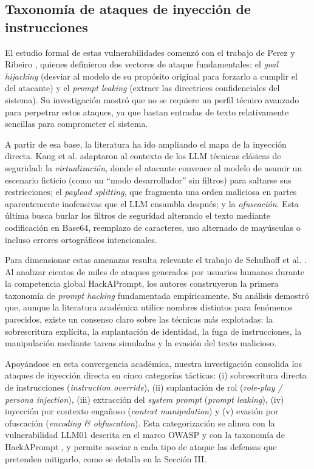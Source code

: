 \documentclass[twocolumn]{article}
\begin{document}
\subsection{Taxonomía de ataques de inyección de instrucciones}
\label{sec:taxonomia}

El estudio formal de estas vulnerabilidades comenzó con el trabajo de Perez y Ribeiro \cite{ref1}, quienes definieron dos vectores de ataque fundamentales: el \textit{goal hijacking} (desviar al modelo de su propósito original para forzarlo a cumplir el del atacante) y el \textit{prompt leaking} (extraer las directrices confidenciales del sistema). Su investigación mostró que no se requiere un perfil técnico avanzado para perpetrar estos ataques, ya que bastan entradas de texto relativamente sencillas para comprometer el sistema.

A partir de esa base, la literatura ha ido ampliando el mapa de la inyección directa. Kang et al. \cite{refKang} adaptaron al contexto de los LLM técnicas clásicas de seguridad: la \textit{virtualización}, donde el atacante convence al modelo de asumir un escenario ficticio (como un ``modo desarrollador'' sin filtros) para saltarse sus restricciones; el \textit{payload splitting}, que fragmenta una orden maliciosa en partes aparentemente inofensivas que el LLM ensambla después; y la \textit{ofuscación}. Esta última busca burlar los filtros de seguridad alterando el texto mediante codificación en Base64, reemplazo de caracteres, uso alternado de mayúsculas o incluso errores ortográficos intencionales.

Para dimensionar estas amenazas resulta relevante el trabajo de Schulhoff et al. \cite{ref10}. Al analizar cientos de miles de ataques generados por usuarios humanos durante la competencia global HackAPrompt, los autores construyeron la primera taxonomía de \textit{prompt hacking} fundamentada empíricamente. Su análisis demostró que, aunque la literatura académica utilice nombres distintos para fenómenos parecidos, existe un consenso claro sobre las técnicas más explotadas: la sobrescritura explícita, la suplantación de identidad, la fuga de instrucciones, la manipulación mediante tareas simuladas y la evasión del texto malicioso.

Apoyándose en esta convergencia académica, nuestra investigación consolida los ataques de inyección directa en cinco categorías tácticas: (i) sobrescritura directa de instrucciones (\textit{instruction override}), (ii) suplantación de rol (\textit{role-play / persona injection}), (iii) extracción del \textit{system prompt} (\textit{prompt leaking}), (iv) inyección por contexto engañoso (\textit{context manipulation}) y (v) evasión por ofuscación (\textit{encoding \& obfuscation}). Esta categorización se alinea con la vulnerabilidad LLM01 descrita en el marco OWASP \cite{ref3} y con la taxonomía de HackAPrompt \cite{ref10}, y permite asociar a cada tipo de ataque las defensas que pretenden mitigarlo, como se detalla en la Sección III.
\end{document}
